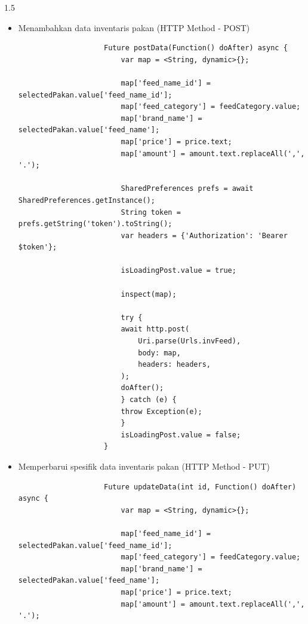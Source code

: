 \begin{spacing}{1.5}
\begin{enumerate}
\begin{enumerate}
\begin{itemize}
\begin{lstlisting}
							// desc.text = res.data!.description.toString();
							price.text = res.data!.price.toString();
							amount.text = res.data!.amount!.toStringAsFixed(2);
							producer.text = res.data!.feed!.producer.toString();
							protein.text = res.data!.feed!.protein.toString();
							carbo.text = res.data!.feed!.carbohydrate.toString();
							minExp.text = res.data!.feed!.minExpiredPeriod.toString();
							// maxExp.text = res.data!.maxExpiredPeriod.toString();
							// image.value = res.data!.image.toString();
						  }
						  doAfter();
						} catch (e) {
						  throw Exception(e);
						}
						isLoadingDetail.value = false;
						isLoadingFeedDetail.value = false;
					  }
				\end{lstlisting}

				\item Menambahkan data inventaris pakan (HTTP Method - POST)
				
				\begin{lstlisting}
					Future postData(Function() doAfter) async {
						var map = <String, dynamic>{};

						map['feed_name_id'] = selectedPakan.value['feed_name_id'];
						map['feed_category'] = feedCategory.value;
						map['brand_name'] = selectedPakan.value['feed_name'];
						map['price'] = price.text;
						map['amount'] = amount.text.replaceAll(',', '.');

						SharedPreferences prefs = await SharedPreferences.getInstance();
						String token = prefs.getString('token').toString();
						var headers = {'Authorization': 'Bearer $token'};

						isLoadingPost.value = true;

						inspect(map);

						try {
						await http.post(
							Uri.parse(Urls.invFeed),
							body: map,
							headers: headers,
						);
						doAfter();
						} catch (e) {
						throw Exception(e);
						}
						isLoadingPost.value = false;
					}
				\end{lstlisting}

				\item Memperbarui spesifik data inventaris pakan (HTTP Method - PUT)
				
				\begin{lstlisting}
					Future updateData(int id, Function() doAfter) async {
						var map = <String, dynamic>{};

						map['feed_name_id'] = selectedPakan.value['feed_name_id'];
						map['feed_category'] = feedCategory.value;
						map['brand_name'] = selectedPakan.value['feed_name'];
						map['price'] = price.text;
						map['amount'] = amount.text.replaceAll(',', '.');


\end{lstlisting}
\end{itemize}
\end{enumerate}
\end{enumerate}
\end{spacing}

